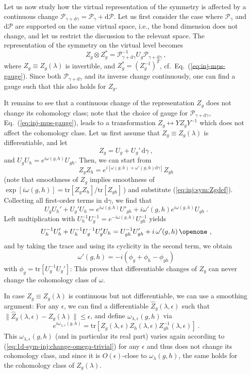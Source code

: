 \documentclass[twocolumn,superscriptaddress,prb,linenumbers]{revtex4-1}
\newcommand{\mc}[1]{\mathcal{#1}}
\newcommand{\tr}{\mathrm{tr}}
\newcommand{\dd}{\mathrm{d}}
\begin{document}
Let us now study how the virtual representation of the symmetry is
affected by a continuous change $\mc P_{\gamma+\dd\gamma}= \mc P_\gamma
    +\dd\mc P$. Let us first consider the case where $\mc P_\gamma$ and
$\dd\mc P$ are supported on the same virtual space, i.e., the bond
dimension does not change, and let us restrict the discussion to the
relevant space. The representation of the symmetry on the virtual level
becomes\cite{david:stringorder-1d}
\[
    Z_g\otimes Z_g^{*} =
    \mc P_{\gamma+\dd\gamma}^{-1} U_g
    \mc P_{\gamma+\dd\gamma} \ ,
\]
where  $Z_g\equiv Z_g(\lambda)$ is
invertible, and $Z_g^{*}=(Z_g^{-1})^T$, cf.~Eq.~(\ref{eq:inj-mps-gauge}).
Since both $\mc P_{\gamma+\dd\gamma}$ and its inverse change continuously,
one can find a gauge such that this also holds for $Z_g$.

It remains to see that a continuous change of the representation $Z_g$ does
not change its cohomology class; note that the choice of gauge for $\mc
    P_{\gamma+\dd\gamma}$, Eq.~(\ref{eq:inj-mps-gauge}), leads to a transformation $Z_g
    \leftrightarrow Y Z_g Y^{-1}$ which does not affect the cohomology class.
Let us first assume that $Z_g\equiv Z_g(\lambda)$ is differentiable,
and let
\begin{equation}
    \label{eq:inj:sym:Zgdef}
    Z_g = U_g + U_g'\,\dd\gamma\ ,
\end{equation}
and $U_gU_h=e^{i\omega(g,h)}U_{gh}$.
Then, we can start from
\[
    Z_g Z_h = e^{i[\omega(g,h)+\omega'(g,h)\dd\gamma]} Z_{gh}
\]
(note that smoothness of $Z_g$ implies smoothness of
$\exp[i\omega(g,h)]=\tr[Z_g Z_h]/\tr[Z_{gh}]$\,)
and substitute (\ref{eq:inj:sym:Zgdef}). Collecting all
first-order terms in $\dd\gamma$, we find that
\[
    U_g U_h' + U_g' U_h =
    e^{i\omega(g,h)} U'_{gh} + i\omega'(g,h) e^{i\omega(g,h)} U_{gh}\ .
\]
Left multiplication with $U_h^{-1} U_g^{-1} = e^{-i\omega(g,h)}
    U_{gh}^{-1}$ yields
\[
    U_h^{-1}U_h'  + U_h^{-1}U_g^{-1}U_g' U_{h} =
    U_{gh}^{-1} U'_{gh} + i\,\omega'(g,h)\,\openone\ ,
\]
and by taking the trace and using its cyclicity in the second term, we
obtain
\begin{equation}
    \label{eq:1d-sym-inj:change-omega-trivial}
    \omega'(g,h) = -i(\phi_g+\phi_h-\phi_{gh})
\end{equation}
with $\phi_g = \tr[U_g^{-1}U_g']$: This proves that differentiable changes of $Z_g$ can
never change the cohomology class of $\omega$.

In case $Z_g\equiv Z_g(\lambda)$ is continuous but not differentiable, we
can use a smoothing argument: For any $\epsilon$, we can find a
differentiable $\hat Z_g(\lambda,\epsilon)$ such that $\|\hat
    Z_g(\lambda,\epsilon)- Z_g(\lambda)\|\le \epsilon$, and define
$\omega_{\lambda,\epsilon}(g,h)$ via
\[
    e^{i\omega_{\lambda,\epsilon}(g,h)} = \tr[Z_g(\lambda,\epsilon)
        Z_h(\lambda,\epsilon) Z_{gh}^{-1}(\lambda,\epsilon)]\ .
\]
This $\omega_{\lambda,\epsilon}(g,h)$ (and in particular its real part)
varies again according to (\ref{eq:1d-sym-inj:change-omega-trivial}) for
any $\epsilon$ and thus does not change its cohomology class, and since
it is $O(\epsilon)$-close to $\omega_\lambda(g,h)$, the same holds for the
cohomology class of $Z_g(\lambda)$.
\end{document}
